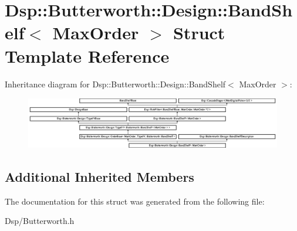 \hypertarget{structDsp_1_1Butterworth_1_1Design_1_1BandShelf}{\section{Dsp\-:\-:Butterworth\-:\-:Design\-:\-:Band\-Shelf$<$ Max\-Order $>$ Struct Template Reference}
\label{structDsp_1_1Butterworth_1_1Design_1_1BandShelf}
}
Inheritance diagram for Dsp\-:\-:Butterworth\-:\-:Design\-:\-:Band\-Shelf$<$ Max\-Order $>$\-:\begin{figure}[H]
\begin{center}
\leavevmode
\includegraphics[height=2.271805cm]{structDsp_1_1Butterworth_1_1Design_1_1BandShelf}
\end{center}
\end{figure}
\subsection*{Additional Inherited Members}


The documentation for this struct was generated from the following file\-:\begin{DoxyCompactItemize}
\item 
Dsp/Butterworth.\-h\end{DoxyCompactItemize}
